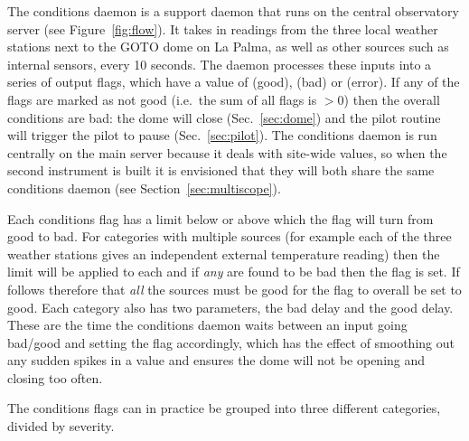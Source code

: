\begin{colsection}
\begin{colsection}
The conditions daemon is a support daemon that runs on the central observatory server (see Figure~\ref{fig:flow}). It takes in readings from the three local weather stations next to the GOTO dome on La Palma, as well as other sources such as internal sensors, every 10 seconds. The daemon processes these inputs into a series of output flags, which have a value of  (good),  (bad) or  (error). If any of the flags are marked as not good (i.e.\ the sum of all flags is $>0$) then the overall conditions are bad: the dome will close (Sec.~\ref{sec:dome}) and the pilot  routine will trigger the pilot to pause (Sec.~\ref{sec:pilot}). The conditions daemon is run centrally on the main server because it deals with site-wide values, so when the second instrument is built it is envisioned that they will both share the same conditions daemon (see Section~\ref{sec:multiscope}).

Each conditions flag has a limit below or above which the flag will turn from good to bad. For categories with multiple sources (for example each of the three weather stations gives an independent external temperature reading) then the limit will be applied to each and if \textit{any} are found to be bad then the flag is set. If follows therefore that \textit{all} the sources must be good for the flag to overall be set to good. Each category also has two parameters, the bad delay and the good delay. These are the time the conditions daemon waits between an input going bad/good and setting the flag accordingly, which has the effect of smoothing out any sudden spikes in a value and ensures the dome will not be opening and closing too often.

The conditions flags can in practice be grouped into three different categories, divided by severity.


\end{colsection}
\end{colsection}
